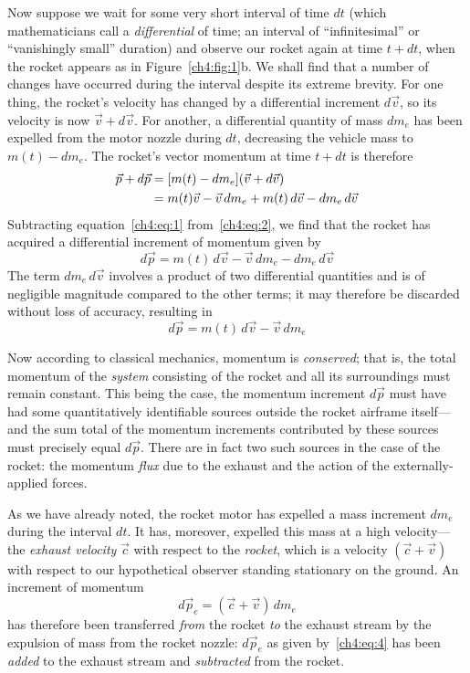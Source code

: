 Now suppose we wait for some very short interval of time $dt$ (which mathematicians call a
\emph{differential} of time; an interval of ``infinitesimal'' or ``vanishingly small'' duration)
and observe our rocket again at time $t + dt$, when the rocket appears as in
Figure~\ref{ch4:fig:1}b. We shall find that a number of changes have occurred during the interval
despite its extreme brevity. For one thing, the rocket's velocity has changed by a differential
increment $d\vec{v}$, so its velocity is now $\vec{v} + d\vec{v}$. For another, a differential
quantity of mass $dm_e$ has been expelled from the motor nozzle during $dt$, decreasing the vehicle
mass to $m(t) - dm_e$. The rocket's vector momentum at time $t + dt$ is therefore
\begin{align}
\vec{p} + d\vec{p} &= [m(t) - dm_e](\vec{v} + d\vec{v}) \label{ch4:eq:2}\\
&= m(t)\vec{v} - \vec{v}\,dm_e + m(t)\,d\vec{v} - dm_e\,d\vec{v} \notag
\end{align}
Subtracting equation~\eqref{ch4:eq:1} from~\eqref{ch4:eq:2}, we find that the rocket has acquired
a differential increment of momentum given by
\begin{equation*}
d\vec{p} = m(t)\,d\vec{v} - \vec{v}\,dm_e - dm_e\,d\vec{v}
\end{equation*}
The term $dm_e\,d\vec{v}$ involves a product of two differential quantities and is of negligible
magnitude compared to the other terms; it may therefore be discarded without loss of accuracy,
resulting in
\begin{equation}\label{ch4:eq:3}
d\vec{p} = m(t)\,d\vec{v} - \vec{v}\,dm_e
\end{equation}

Now according to classical mechanics, momentum is \emph{conserved}; that is, the total momentum of
the \emph{system} consisting of the rocket and all its surroundings must remain constant. This
being the case, the momentum increment $d\vec{p}$ must have had some quantitatively identifiable
sources outside the rocket airframe itself---and the sum total of the momentum increments
contributed by these sources must precisely equal $d\vec{p}$. There are in fact two such sources
in the case of the rocket: the momentum \emph{flux} due to the exhaust and the action of the
externally-applied forces.

As we have already noted, the rocket motor has expelled a mass increment $dm_e$ during the interval
$dt$. It has, moreover, expelled this mass at a high velocity---the \emph{exhaust velocity}
$\vec{c}$ with respect to the \emph{rocket}, which is a velocity $(\vec{c} + \vec{v})$ with
respect to our hypothetical observer standing stationary on the ground. An increment of momentum
\begin{equation}\label{ch4:eq:4}
d\vec{p}_e = (\vec{c} + \vec{v})\,dm_e
\end{equation}
has therefore been transferred \emph{from} the rocket \emph{to} the exhaust stream by the expulsion
of mass from the rocket nozzle: $d\vec{p}_e$ as given by~\eqref{ch4:eq:4} has been \emph{added} to
the exhaust stream and \emph{subtracted} from the rocket.

